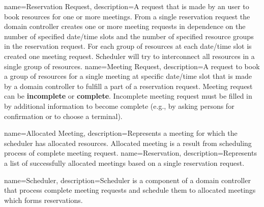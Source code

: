 %
%
{
  name=Reservation Request,
  description={A request that is made by an user to book resources for one or 
    more meetings.  From a single reservation request the domain controller 
    creates one or more meeting requests in dependence on the number of 
    specified date/time slots and the number of specified resource groups in 
    the reservation request. For each group of resources at each date/time slot 
    is created one meeting request. Scheduler will try to interconnect all 
    resources in a single group of resources.}
}
{
  name=Meeting Request,
  description={A request to book a group of resources for a single meeting at 
    specific date/time slot that is made by a domain controller to fulfill a 
    part of a reservation request. Meeting request can be \textbf{incomplete} 
    or \textbf{complete}. Incomplete meeting request must be filled in by 
    additional information to become complete (e.g., by asking persons for 
    confirmation or to choose a terminal).}
}

{
  name=Allocated Meeting,
  description={Represents a meeting for which the scheduler has allocated 
    resources. Allocated meeting is a result from scheduling process of 
    complete meeting request.}
}
{
  name=Reservation,
  description={Represents a list of successfully allocated meetings based on a 
    single reservation request.}
}

%
%
{
  name=Scheduler,
  description={Scheduler is a component of a domain controller that process 
    complete meeting requests and schedule them to allocated meetings which 
    forms reservations.}
}
